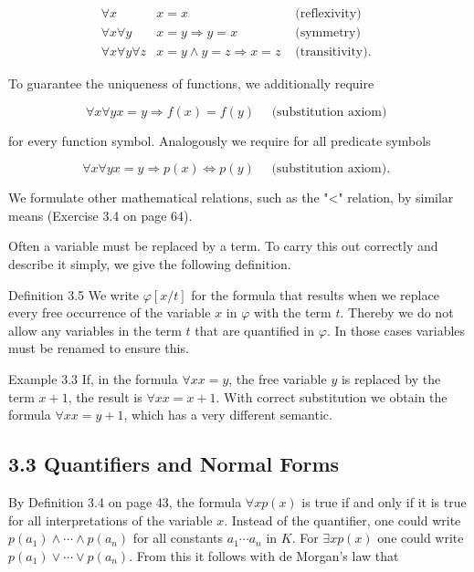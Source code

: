 \documentclass[10pt]{book}
\begin{document}
\[
\begin{array}{rll}
\forall x & x=x & \text { (reflexivity) } \\
\forall x \forall y & x=y \Rightarrow y=x & \text { (symmetry) }  \tag{3.1}\\
\forall x \forall y \forall z & x=y \wedge y=z \Rightarrow x=z & \text { (transitivity). }
\end{array}
\]

To guarantee the uniqueness of functions, we additionally require


\begin{equation*}
\forall x \forall y x=y \Rightarrow f(x)=f(y) \quad \text { (substitution axiom) } \tag{3.2}
\end{equation*}


for every function symbol. Analogously we require for all predicate symbols


\begin{equation*}
\forall x \forall y x=y \Rightarrow p(x) \Leftrightarrow p(y) \quad \text { (substitution axiom). } \tag{3.3}
\end{equation*}


We formulate other mathematical relations, such as the "<" relation, by similar means (Exercise 3.4 on page 64).

Often a variable must be replaced by a term. To carry this out correctly and describe it simply, we give the following definition.

Definition 3.5 We write $\varphi[x / t]$ for the formula that results when we replace every free occurrence of the variable $x$ in $\varphi$ with the term $t$. Thereby we do not allow any variables in the term $t$ that are quantified in $\varphi$. In those cases variables must be renamed to ensure this.

Example 3.3 If, in the formula $\forall x x=y$, the free variable $y$ is replaced by the term $x+1$, the result is $\forall x x=x+1$. With correct substitution we obtain the formula $\forall x x=y+1$, which has a very different semantic.

\subsection*{3.3 Quantifiers and Normal Forms}
By Definition 3.4 on page 43, the formula $\forall x p(x)$ is true if and only if it is true for all interpretations of the variable $x$. Instead of the quantifier, one could write $p\left(a_{1}\right) \wedge \cdots \wedge p\left(a_{n}\right)$ for all constants $a_{1} \cdots a_{n}$ in $K$. For $\exists x p(x)$ one could write $p\left(a_{1}\right) \vee \cdots \vee p\left(a_{n}\right)$. From this it follows with de Morgan's law that
\end{document}
